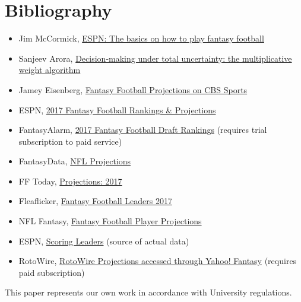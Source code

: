 \documentclass[12pt, final, onecolumn, titlepage]{article}
\theoremstyle{definition}
\begin{document}
\newpage
\section{Bibliography}
\begin{itemize}
\item Jim McCormick, \href{https://www.espn.com/fantasy/football/ffl/story?page=nfldk2k10howtoplay}{ESPN: The basics on how to play fantasy football}
\item Sanjeev Arora, \href{https://www.cs.princeton.edu/courses/archive/fall16/cos521/Lectures/lec8.pdf}{Decision-making under total uncertainty: the multiplicative weight algorithm}
\item Jamey Eisenberg, \href{https://fantasynews.cbssports.com/fantasyfootball/stats/weeklyprojections/QB/1/jamey_eisenberg/standard?&print_rows=9999}{Fantasy Football Projections on CBS Sports}
\item ESPN, \href{https://games.espn.com/ffl/tools/projections?&scoringPeriodId=1&seasonId=2017&slotCategoryId=0}{2017 Fantasy Football Rankings \& Projections}
\item FantasyAlarm, \href{https://www.fantasyalarm.com/nfl/rankings/1/STD/QB}{2017 Fantasy Football Draft Rankings} (requires trial subscription to paid service)
\item FantasyData, \href{https://fantasydata.com/nfl-stats/fantasy-football-weekly-projections.aspx?stype=0&w=1&ew=1&p=1}{NFL Projections}
\item FF Today, \href{https://www.fftoday.com/rankings/playerwkproj.php?Season=2017&GameWeek=1&PosID=10}{Projections: 2017}
\item Fleaflicker, \href{https://www.fleaflicker.com/nfl/leaders?week=1&sortMode=2&statType=2&position=4}{Fantasy Football Leaders 2017}
\item NFL Fantasy, \href{http://fantasy.nfl.com/research/projections?position=1&sort=projectedPts&statCategory=projectedStats&statSeason=2017&statType=weekProjectedStats&statWeek=1}{Fantasy Football Player Projections}
\item ESPN, \href{https://games.espn.com/ffl/leaders?&scoringPeriodId=1&seasonId=2017&slotCategoryId=0}{Scoring Leaders} (source of actual data)
\item RotoWire, \href{https://football.fantasysports.yahoo.com/f1/731507/players}{RotoWire Projections accessed through Yahoo! Fantasy} (requires paid subscription)
\end{itemize}

This paper represents our own work in accordance with University regulations.
\end{document}
